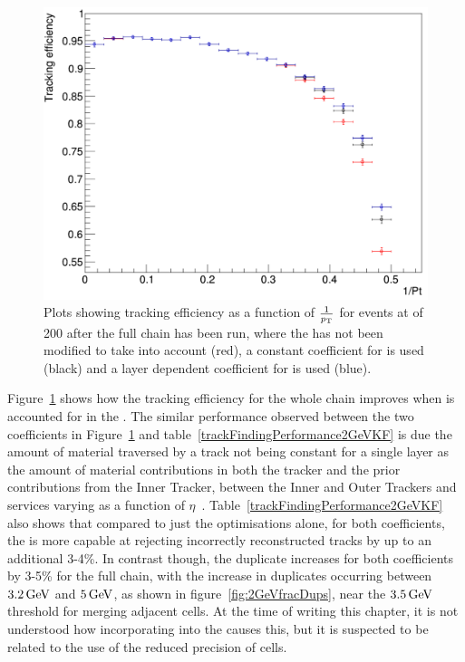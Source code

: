 \begin{figure}[tbp]
\centering
\includegraphics[width=\textwidth]{figs/tk-upgrade/results-lowPtTracking/kfTrackingEffVsInvPtFlatGeometry_5000.pdf}
\caption{Plots showing tracking efficiency as a function of $\frac{1}{p_{\mathrm{T}}}$ for \ttbar events at \PU of 200 after the full chain has been run, where the \KF has not been modified to take \MS into account (red), a constant coefficient for \MS is used (black) and a layer dependent coefficient for \MS is used (blue).
}
\label{fig:2GeVTiltEff}	
\end{figure}

Figure~\ref{fig:2GeVTiltEff} shows how the tracking efficiency for the whole chain improves when \MS is accounted for in the \KF.
The similar performance observed between the two coefficients in Figure~\ref{fig:2GeVTiltEff} and table~\ref{trackFindingPerformance2GeVKF} is due the amount of material traversed by a track not being constant for a single layer as the amount of material contributions in both the tracker and the prior contributions from the Inner Tracker, between the Inner and Outer Trackers and services varying as a function of $\eta$~\cite{P2TrackerTDR}.
Table~\ref{trackFindingPerformance2GeVKF} also shows that compared to just the \HT optimisations alone, for both \MS coefficients, the \KF is more capable at rejecting incorrectly reconstructed tracks by up to an additional 3-4\%.
In contrast though, the duplicate increases for both coefficients by 3-5\% for the full chain, with the increase in duplicates occurring between $3.2\,\text{Ge\hspace{-.08em}V}$ and $5\,\text{Ge\hspace{-.08em}V}$, as shown in figure~\ref{fig:2GeVfracDups}, near the $3.5\,\text{Ge\hspace{-.08em}V}$ threshold for merging adjacent \HT cells.
At the time of writing this chapter, it is not understood how incorporating \MS into the \KF causes this, but it is suspected to be related to the use of the reduced precision of \HT cells.

